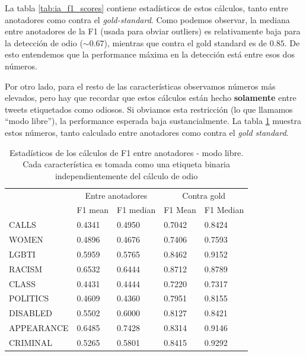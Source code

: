 La tabla \ref{tab:ia_f1_scores} contiene estadísticos de estos cálculos, tanto entre anotadores como contra el \emph{gold-standard}. Como podemos observar, la mediana entre anotadores de la F1 (usada para obviar outliers) es relativamente baja para la detección de odio ($\sim 0.67$), mientras que contra el gold standard es de $0.85$. De esto entendemos que la performance máxima en la detección está entre esos dos números.

Por otro lado, para el resto de las características observamos números más elevados, pero hay que recordar que estos cálculos están hecho \textbf{solamente} entre tweets etiquetados como odiosos. Si obviamos esta restricción (lo que llamamos ``modo libre''), la performance esperada baja sustancialmente. La tabla \ref{tab:ia_f1_scores_free_mode} muestra estos números, tanto calculado entre anotadores como contra el \emph{gold standard}.

\begin{table}
    \centering
    \begin{tabular}{lll|ll}
        \hline
                   & \multicolumn{2}{c}{Entre anotadores} & \multicolumn{2}{c}{Contra gold} \\
        {}         &  F1 mean&  F1 median  & F1 Mean  &  F1 Median \\
        \hline
        CALLS      &  0.4341 &   0.4950   &  0.7042   &   0.8424  \\
        WOMEN      &  0.4896 &   0.4676   &  0.7406   &   0.7593  \\
        LGBTI      &  0.5959 &   0.5765   &  0.8462   &   0.9152  \\
        RACISM     &  0.6532 &   0.6444   &  0.8712   &   0.8789  \\
        CLASS      &  0.4431 &   0.4444   &  0.7220   &   0.7317  \\
        POLITICS   &  0.4609 &   0.4360   &  0.7951   &   0.8155  \\
        DISABLED   &  0.5502 &   0.6000   &  0.8127   &   0.8421  \\
        APPEARANCE &  0.6485 &   0.7428   &  0.8314   &   0.9146  \\
        CRIMINAL   &  0.5265 &   0.5801   &  0.8415   &   0.9292  \\
        \bottomrule
    \end{tabular}

    \caption{Estadísticos de los cálculos de F1 entre anotadores - modo libre. Cada característica es tomada como una etiqueta binaria independientemente del cálculo de odio}
    \label{tab:ia_f1_scores_free_mode}
\end{table}



